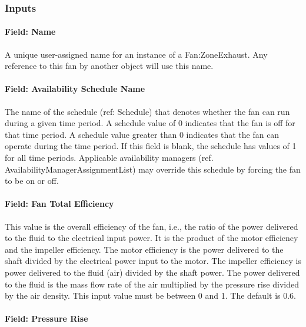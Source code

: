 \subsubsection{Inputs}\label{inputs-3-014}

\paragraph{Field: Name}\label{field-name-3-013}

A unique user-assigned name for an instance of a Fan:ZoneExhaust. Any reference to this fan by another object will use this name.

\paragraph{Field: Availability Schedule Name}\label{field-availability-schedule-name-3-002}

The name of the schedule (ref: Schedule) that denotes whether the fan can run during a given time period. A schedule value of 0 indicates that the fan is off for that time period. A schedule value greater than 0 indicates that the fan can operate during the time period. If this field is blank, the schedule has values of 1 for all time periods. Applicable availability managers (ref. AvailabilityManagerAssignmentList) may override this schedule by forcing the fan to be on or off.

\paragraph{Field: Fan Total Efficiency}\label{field-fan-total-efficiency-3}

This value is the overall efficiency of the fan, i.e., the ratio of the power delivered to the fluid to the electrical input power. It is the product of the motor efficiency and the impeller efficiency. The motor efficiency is the power delivered to the shaft divided by the electrical power input to the motor. The impeller efficiency is power delivered to the fluid (air) divided by the shaft power. The power delivered to the fluid is the mass flow rate of the air multiplied by the pressure rise divided by the air density. This input value must be between 0 and 1. The default is 0.6.

\paragraph{Field: Pressure Rise}\label{field-pressure-rise-3}


